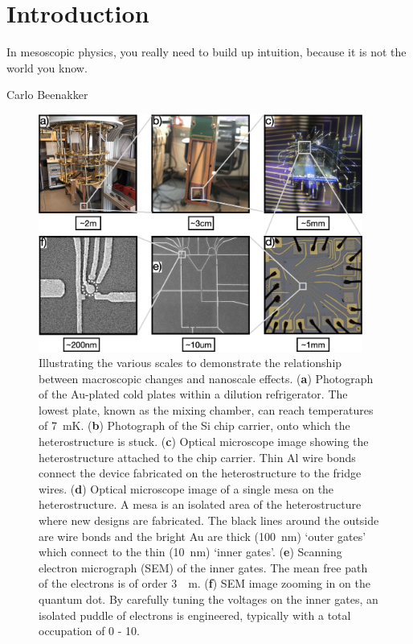 \chapter{Introduction}\label{cha:intro}
\epigraph{In mesoscopic physics, you really need to build up intuition, because it is not the world you know.}{Carlo Beenakker}


\begin{figure}[!htb]
 \begin{center}
 \includegraphics[width=0.95\textwidth]{figures/ch1/crop_FiguresMaster.001.png}
 \caption[Dilution fridge to quantum dot scale breakdown]{\label{fig:ch1/scale_breakdown} 
 Illustrating the various scales to demonstrate the relationship between macroscopic changes and nanoscale effects. (\textbf{a}) Photograph of the Au-plated cold plates within a dilution refrigerator. The lowest plate, known as the mixing chamber, can reach temperatures of \qty{7}{mK}. (\textbf{b}) Photograph of the Si chip carrier, onto which the heterostructure is stuck. (\textbf{c}) Optical microscope image showing the heterostructure attached to the chip carrier. Thin Al wire bonds connect the device fabricated on the heterostructure to the fridge wires. (\textbf{d}) Optical microscope image of a single mesa on the heterostructure. A mesa is an isolated area of the heterostructure where new designs are fabricated. The black lines around the outside are wire bonds and the bright Au are thick (\qty{100}{nm}) `outer gates' which connect to the thin (\qty{10}{nm}) `inner gates'. (\textbf{e}) Scanning electron micrograph (SEM) of the inner gates. The mean free path of the electrons is of order \qty{3}{\mu m}. (\textbf{f}) SEM image zooming in on the quantum dot. By carefully tuning the voltages on the inner gates, an isolated puddle of electrons is engineered, typically with a total occupation of 0 - 10. 
  }
 \end{center}
\end{figure}




